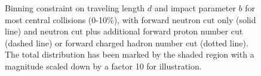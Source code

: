 \begin{figure} 
\begin{center} 
\quad
{}
\caption[The most central bin]
{Binning constraint on traveling length $d$ and impact parameter $b$ for most
central collisions (0-10\%), with forward neutron cut only (solid line) and
neutron cut plus additional forward proton number cut (dashed line) or forward
charged hadron number cut (dotted line). The total distribution has been marked by
the shaded region with a magnitude scaled down by a factor 10 for illustration.
}
\label{fig:geoConstrain_central}
\end{center} 
\end{figure}

